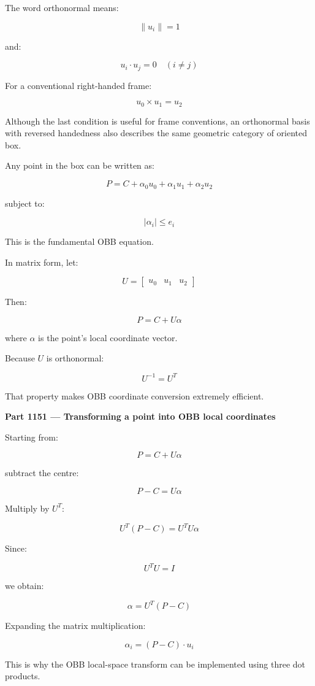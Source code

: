 The word orthonormal means:

\[
\boxed{\|u_i\|=1}
\]

and:

\[
\boxed{u_i\cdot u_j=0\quad(i\ne j)}
\]

For a conventional right-handed frame:

\[
u_0\times u_1=u_2
\]

Although the last condition is useful for frame conventions, an orthonormal basis with reversed handedness also describes the same geometric category of oriented box.

Any point in the box can be written as:

\[
\boxed{ P=C+\alpha_0u_0+\alpha_1u_1+\alpha_2u_2 }
\]

subject to:

\[
|\alpha_i|\le e_i
\]

This is the fundamental OBB equation.

In matrix form, let:

\[
U= \begin{bmatrix} u_0&u_1&u_2 \end{bmatrix}
\]

Then:

\[
P=C+U\alpha
\]

where \(\alpha\) is the point's local coordinate vector.

Because \(U\) is orthonormal:

\[
\boxed{U^{-1}=U^T}
\]

That property makes OBB coordinate conversion extremely efficient.

\textbf{Part 1151 --- Transforming a point into OBB local coordinates}

Starting from:

\[
P=C+U\alpha
\]

subtract the centre:

\[
P-C=U\alpha
\]

Multiply by \(U^T\):

\[
U^T(P-C)=U^TU\alpha
\]

Since:

\[
U^TU=I
\]

we obtain:

\[
\boxed{\alpha=U^T(P-C)}
\]

Expanding the matrix multiplication:

\[
\boxed{ \alpha_i=(P-C)\cdot u_i }
\]

This is why the OBB local-space transform can be implemented using three dot products.

